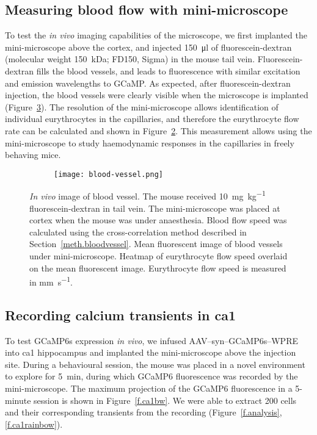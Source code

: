 \subsection{Measuring blood flow with mini-microscope}
To test the \textit{in vivo} imaging capabilities of the microscope, we first implanted the mini-microscope above the cortex, and injected \SI{150}{\ul} of fluorescein-dextran (molecular weight \SI{150}{\kilo\dalton}; FD150, Sigma) in the mouse tail vein. Fluorescein-dextran fills the blood vessels, and leads to fluorescence with similar excitation and emission wavelengths to GCaMP. As expected, after fluorescein-dextran injection, the blood vessels were clearly visible when the microscope is implanted (Figure~\ref{f.bloodvessel}). The resolution of the mini-microscope allows identification of individual eurythrocytes in the capillaries, and therefore the eurythrocyte flow rate can be calculated and shown in Figure~\ref{fig.sub.vel}. This measurement allows using the mini-microscope to study haemodynamic responses in the capillaries in freely behaving mice. 
\begin{figure}[h]
    \begin{subfigure}[h]{.5\linewidth}
        \centering
        \texttt{[image: blood-vessel.png]}
        \caption{\label{fig.sub.bv}}
    \end{subfigure}
    \begin{subfigure}[h]{.5\linewidth}
        
        \caption{\label{fig.sub.vel}}
    \end{subfigure}
    \caption[\textit{In vivo} image of blood vessels.]{\textit{In vivo} image of blood vessel. The mouse received \SI{10}{\mg\per\kg} fluorescein-dextran in tail vein. The mini-microscope was placed at cortex when the mouse was under anaesthesia. Blood flow speed was calculated using the cross-correlation method described in Section~\ref{meth.bloodvessel}.  Mean fluorescent image of blood vessels under mini-microscope.  Heatmap of eurythrocyte flow speed overlaid on the mean fluorescent image. Eurythrocyte flow speed is measured in \si{\mm\per\second}. \label{f.bloodvessel}}
\end{figure}


\subsection{Recording calcium transients in \gls{ca1}}
To test GCaMP6s expression \textit{in vivo}, we infused AAV--syn--GCaMP6s--WPRE into \gls{ca1} hippocampus and implanted the mini-microscope above the injection site. During a behavioural session, the mouse was placed in a novel environment to explore for \SI{5}{\minute}, during which GCaMP6 fluorescence was recorded by the mini-microscope. The maximum projection of the GCaMP6 fluorescence in a 5-minute session is shown in Figure~\ref{f.ca1bw}. We were able to extract 200 cells and their corresponding  transients from the recording (Figure~\ref{f.analysis}, \ref{f.ca1rainbow}).

